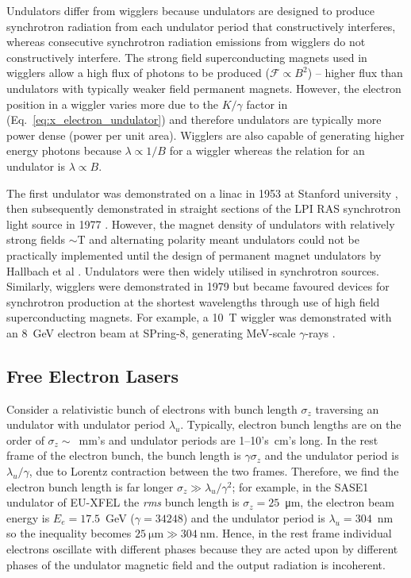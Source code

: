 \documentclass[../main.tex]{subfiles}
\begin{document}
Undulators differ from wigglers because undulators are designed to produce synchrotron radiation from each undulator period that constructively interferes, whereas consecutive synchrotron radiation emissions from wigglers do not constructively interfere. The strong field superconducting magnets used in wigglers allow a high flux of photons to be produced ($\mathcal{F} \propto B^{2}$) -- higher flux than undulators with typically weaker field permanent magnets. However, the electron position in a wiggler varies more due to the $K/\gamma$ factor in (Eq.~\ref{eq:x_electron_undulator}) and therefore undulators are typically more power dense (power per unit area). Wigglers are also capable of generating higher energy photons because $\lambda \propto 1/B$ for a wiggler whereas the relation for an undulator is $\lambda \propto B$. 

The first undulator was demonstrated on a linac in 1953 at Stanford university \cite{motz1953experiments}, then subsequently demonstrated in straight sections of the LPI RAS synchrotron light source in 1977 \cite{bessonov2010light}. However, the magnet density of undulators with relatively strong fields $\sim$\si{\tesla} and alternating polarity meant undulators could not be practically implemented until the design of permanent magnet undulators by Hallbach et al \cite{halbach1983permanent}. Undulators were then widely utilised in synchrotron sources. Similarly, wigglers were demonstrated in 1979 \cite{berndt1979initial} but became favoured devices for synchrotron production at the shortest wavelengths through use of high field superconducting magnets. For example, a 10~\si{\tesla} wiggler was demonstrated with an 8~\si{\giga\electronvolt} electron beam at SPring-8, generating \si{\mega\electronvolt}-scale $\gamma$-rays \cite{soutome2003generation}.    

\subsection{Free Electron Lasers}

Consider a relativistic bunch of electrons with bunch length $\sigma_{z}$ traversing an undulator with undulator period $\lambda_{u}$. Typically, electron bunch lengths are on the order of $\sigma_{z}\sim$~\si{\milli\meter}'s and undulator periods are 1--10's~\si{\centi\meter}'s long. In the rest frame of the electron bunch, the bunch length is $\gamma\sigma_{z}$ and the undulator period is $\lambda_{u}/\gamma$, due to Lorentz contraction between the two frames. Therefore, we find the electron bunch length is far longer $\sigma_{z}\gg \lambda_{u}/\gamma^{2}$; for example, in the SASE1 undulator of EU-XFEL the \textit{rms} bunch length is $\sigma_{z} = 25$~\si{\micro\meter}, the electron beam energy is $E_{e} = 17.5$~\si{\giga\electronvolt} ($\gamma = 34248$) and the undulator period is $\lambda_{u} = 304$~\si{\nano\meter} so the inequality becomes $25~\si{\micro\meter} \gg 304~\si{\nano\meter}$. Hence, in the rest frame individual electrons oscillate with different phases because they are acted upon by different phases of the undulator magnetic field and the output radiation is incoherent.
\end{document}
